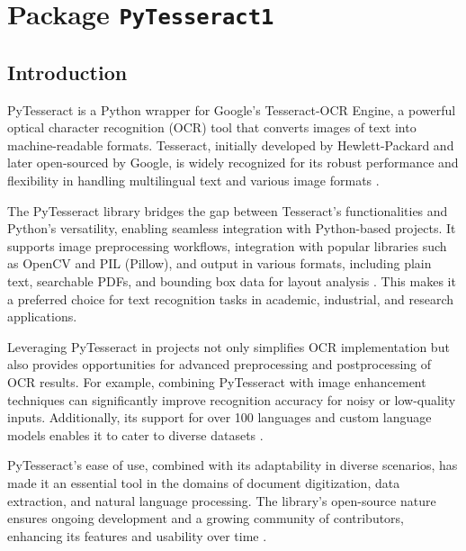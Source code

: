 
%
%



\chapter{Package \texttt{PyTesseract1}}

\section{Introduction}
PyTesseract is a Python wrapper for Google's Tesseract-OCR Engine, a powerful optical character recognition (OCR) tool that converts images of text into machine-readable formats. Tesseract, initially developed by Hewlett-Packard and later open-sourced by Google, is widely recognized for its robust performance and flexibility in handling multilingual text and various image formats \cite{smith:2007}. 



The PyTesseract library bridges the gap between Tesseract's functionalities and Python's versatility, enabling seamless integration with Python-based projects. It supports image preprocessing workflows, integration with popular libraries such as OpenCV and PIL (Pillow), and output in various formats, including plain text, searchable PDFs, and bounding box data for layout analysis \cite{GoogleTesseract:2025}. This makes it a preferred choice for text recognition tasks in academic, industrial, and research applications.



Leveraging PyTesseract in projects not only simplifies OCR implementation but also provides opportunities for advanced preprocessing and postprocessing of OCR results. For example, combining PyTesseract with image enhancement techniques can significantly improve recognition accuracy for noisy or low-quality inputs. Additionally, its support for over 100 languages and custom language models enables it to cater to diverse datasets \cite{patil:2020}.



PyTesseract's ease of use, combined with its adaptability in diverse scenarios, has made it an essential tool in the domains of document digitization, data extraction, and natural language processing. The library’s open-source nature ensures ongoing development and a growing community of contributors, enhancing its features and usability over time \cite{GoogleTesseractOCR:2025}.

